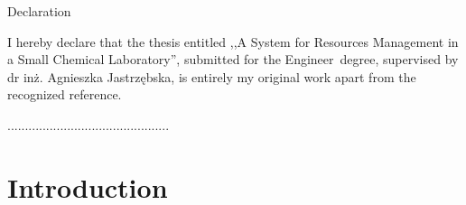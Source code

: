 \documentclass[a4paper,11pt,twoside]{report}
\theoremstyle{definition}
\renewcommand{\title}{A System for Resources Management in a Small Chemical Laboratory}
\newcommand{\type}{Engineer} %
\newcommand{\supervisor}{dr inż. Agnieszka Jastrzębska} %
\begin{document}
\begin{center}
Declaration
\end{center}

I hereby declare that the thesis entitled ,,\title '', submitted for the \type ~degree, supervised  by \supervisor , is entirely my original work apart from the recognized reference.
\vspace{2cm}

\begin{flushright}
  \begin{minipage}{50mm}
    \begin{center}
      ..............................................

    \end{center}
  \end{minipage}
\end{flushright}

\thispagestyle{empty}
\newpage

\null\thispagestyle{empty}\newpage
\tableofcontents
\thispagestyle{empty}
\newpage %



\null\thispagestyle{empty}\newpage
\pagestyle{fancy}
\setcounter{page}{11}


\chapter*{Introduction}
\end{document}

